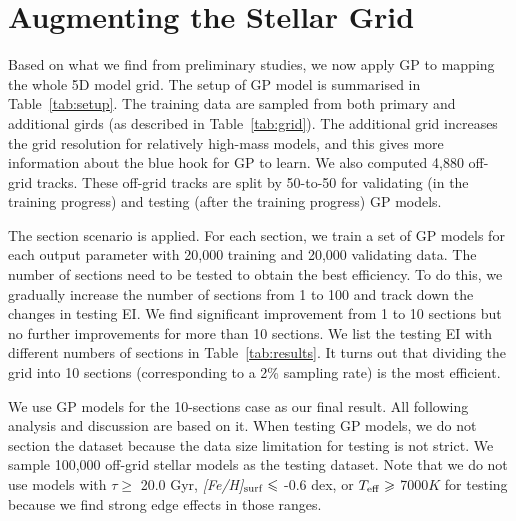\section{Augmenting the Stellar Grid}\label{sec:results}

Based on what we find from preliminary studies, we now apply GP to mapping the whole 5D model grid. The setup of GP model is summarised in Table~\ref{tab:setup}. 
%
The training data are sampled from both primary and additional girds (as described in Table~\ref{tab:grid}). The additional grid increases the grid resolution for relatively high-mass models, and this gives more information about the blue hook for GP to learn.  
%
We also computed 4,880 off-grid tracks. These off-grid tracks are split by 50-to-50 for validating (in the training progress) and testing (after the training progress) GP models.

The section scenario is applied. For each section, we train a set of GP models for each output parameter with 20,000 training and 20,000 validating data.
% 
The number of sections need to be tested to obtain the best efficiency. To do this, we gradually increase the number of sections from 1 to 100 and track down the changes in testing EI. We find significant improvement from 1 to 10 sections but no further improvements for more than 10 sections. We list the testing EI with different numbers of sections in Table~\ref{tab:results}. It turns out that dividing the grid into 10 sections (corresponding to a 2\% sampling rate) is the most efficient. 

We use GP models for the 10-sections case as our final result. All following analysis and discussion are based on it. %
When testing GP models, we do not section the dataset because the data size limitation for testing is not strict. We sample 100,000 off-grid stellar models as the testing dataset. Note that we do not use models with $\tau \geq$ 20.0 Gyr, {\it [Fe/H]}$_{\rm surf} \leq$ -0.6 dex, or $T_{\rm eff} \geq$ 7000$K$ for testing because we find strong edge effects in those ranges. 

